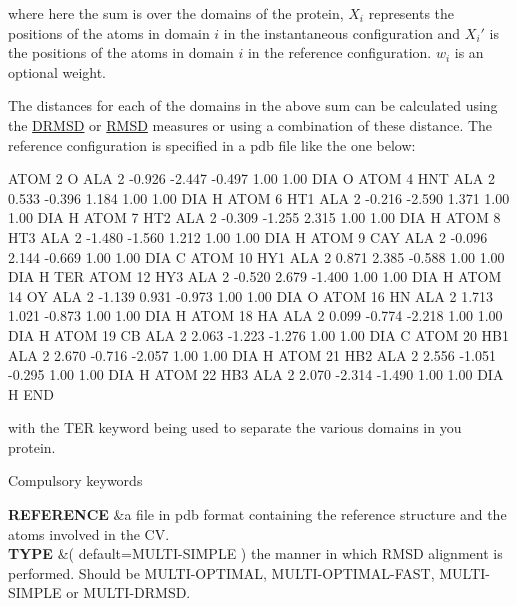 where here the sum is over the domains of the protein, $X_i$ represents the positions of the atoms in domain $i$ in the instantaneous configuration and $X_i'$ is the positions of the atoms in domain $i$ in the reference configuration. $w_i$ is an optional weight.

The distances for each of the domains in the above sum can be calculated using the \hyperlink{DRMSD}{D\+R\+M\+S\+D} or \hyperlink{RMSD}{R\+M\+S\+D} measures or using a combination of these distance. The reference configuration is specified in a pdb file like the one below\+:

\begin{DoxyVerb}ATOM      2  O   ALA     2      -0.926  -2.447  -0.497  1.00  1.00      DIA  O
ATOM      4  HNT ALA     2       0.533  -0.396   1.184  1.00  1.00      DIA  H
ATOM      6  HT1 ALA     2      -0.216  -2.590   1.371  1.00  1.00      DIA  H
ATOM      7  HT2 ALA     2      -0.309  -1.255   2.315  1.00  1.00      DIA  H
ATOM      8  HT3 ALA     2      -1.480  -1.560   1.212  1.00  1.00      DIA  H
ATOM      9  CAY ALA     2      -0.096   2.144  -0.669  1.00  1.00      DIA  C
ATOM     10  HY1 ALA     2       0.871   2.385  -0.588  1.00  1.00      DIA  H
TER
ATOM     12  HY3 ALA     2      -0.520   2.679  -1.400  1.00  1.00      DIA  H
ATOM     14  OY  ALA     2      -1.139   0.931  -0.973  1.00  1.00      DIA  O
ATOM     16  HN  ALA     2       1.713   1.021  -0.873  1.00  1.00      DIA  H
ATOM     18  HA  ALA     2       0.099  -0.774  -2.218  1.00  1.00      DIA  H
ATOM     19  CB  ALA     2       2.063  -1.223  -1.276  1.00  1.00      DIA  C
ATOM     20  HB1 ALA     2       2.670  -0.716  -2.057  1.00  1.00      DIA  H
ATOM     21  HB2 ALA     2       2.556  -1.051  -0.295  1.00  1.00      DIA  H
ATOM     22  HB3 ALA     2       2.070  -2.314  -1.490  1.00  1.00      DIA  H
END
\end{DoxyVerb}


with the T\+E\+R keyword being used to separate the various domains in you protein.

\begin{DoxyParagraph}{Compulsory keywords}

\end{DoxyParagraph}
\begin{TabularC}{2}
\hline
{\bfseries  R\+E\+F\+E\+R\+E\+N\+C\+E } &a file in pdb format containing the reference structure and the atoms involved in the C\+V.   \\
{\bfseries  T\+Y\+P\+E } &( default=M\+U\+L\+T\+I-\/\+S\+I\+M\+P\+L\+E ) the manner in which R\+M\+S\+D alignment is performed. Should be M\+U\+L\+T\+I-\/\+O\+P\+T\+I\+M\+A\+L, M\+U\+L\+T\+I-\/\+O\+P\+T\+I\+M\+A\+L-\/\+F\+A\+S\+T, M\+U\+L\+T\+I-\/\+S\+I\+M\+P\+L\+E or M\+U\+L\+T\+I-\/\+D\+R\+M\+S\+D.   \\
\end{TabularC}


